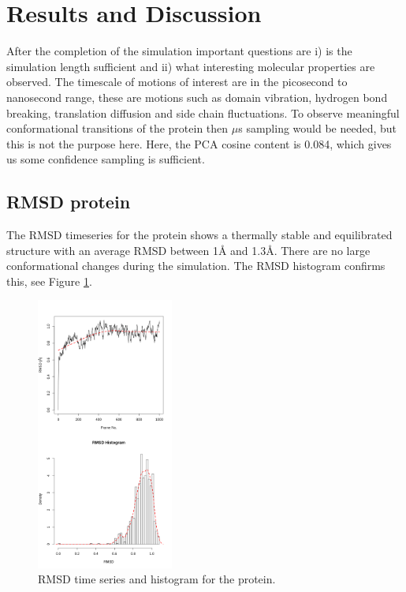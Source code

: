 \documentclass[twocolumn]{bmcart}%
\begin{document}
\hypertarget{resultsanddiscussion}{%
\section*{Results and Discussion}\label{resultsanddiscussion}}
After the completion of the simulation important questions are i) is the simulation length sufficient and ii) what interesting molecular properties are observed. The timescale of motions of interest are in the picosecond to nanosecond range, these are motions such as domain vibration, hydrogen bond breaking, translation diffusion and side chain fluctuations. To observe meaningful conformational transitions of the protein then $\mu$s sampling would be needed, but this is not the purpose here. Here, the PCA cosine content is 0.084, which gives us some confidence sampling is sufficient.

\subsection*{RMSD protein}
The RMSD timeseries for the protein shows a thermally stable and equilibrated structure with
an average RMSD between 1{\AA} and 1.3{\AA}. There are no large conformational changes during the simulation. The RMSD histogram confirms this, see Figure \ref{fig:rmsdprotein}.

\begin{figure}[h!]
  \includegraphics[width=0.4\textwidth]{htmd_analysis_rmsd1_merge}
  \caption{
      RMSD time series and histogram for the protein.}
  \label{fig:rmsdprotein}
\end{figure}
\end{document}
